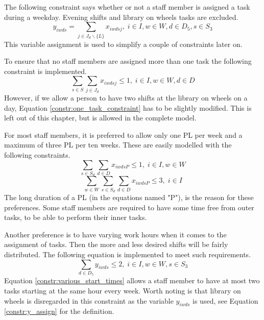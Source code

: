 The following constraint says whether or not a staff member is assigned a task during a weekday. Evening shifts and library on wheels tasks are excluded.
\begin{equation} \label{constr:y_assign}
y_{iwds} = \sum_{j \in J_d\backslash \{L\}} x_{iwdsj}, \;   i \in I, w \in W, d \in D_5, s \in S_3
\end{equation}
This variable assignment is used to simplify a couple of constraints later on.

To ensure that no staff members are assigned more than one task the following constraint is implemented.
\begin{equation} \label{constr:one_task_constraint}
\sum_{s\in S}\sum_{j\in J_d} x_{iwdsj} \leq 1, \;   i\in I, w \in W, d\in D
\end{equation}
However, if we allow a person to have two shifts at the library on wheels on a day, Equation \ref{constr:one_task_constraint} has to be slightly modified. This is left out of this chapter, but is allowed in the complete model.

For most staff members, it is preferred to allow only one PL per week and a maximum of three PL per ten weeks. These are easily modelled with the following constraints.
\begin{equation} \label{constr:one_PL}
\sum_{s \in S_d}\sum_{d \in D} x_{iwdsP} \leq 1, \;   i\in I, w \in W
\end{equation}
\begin{equation} \label{constr:three_PL}
\sum_{w \in W}\sum_{s \in S_d}\sum_{d \in D} x_{iwdsP} \leq 3, \;   i\in I
\end{equation}
The long duration of a PL (in the equations named "P"), is the reason for these preferences. Some staff members are required to have some time free from outer tasks, to be able to perform their inner tasks.

Another preference is to have varying work hours when it comes to the assignment of tasks. Then the more and less desired shifts will be fairly distributed. The following equation is implemented to meet such requirements.
\begin{equation} \label{constr:various_start_times}
\sum_{d \in D_5} y_{iwds} \leq 2, \;   i\in I, w \in W, s \in S_3
\end{equation}
Equation \ref{constr:various_start_times} allows a staff member to have at most two tasks starting at the same hour every week. Worth noting is that library on wheels is disregarded in this constraint as the variable $y_{iwds}$ is used, see Equation \ref{constr:y_assign} for the definition.

